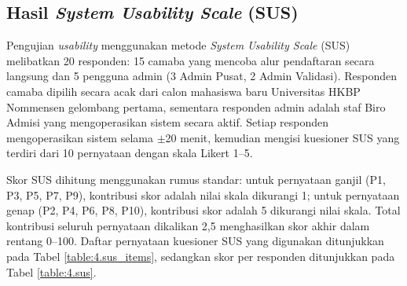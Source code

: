 \subsection{Hasil \textit{System Usability Scale} (SUS)} \label{IV.HasilSUS}

Pengujian \textit{usability} menggunakan metode \textit{System Usability Scale} (SUS) melibatkan 20 responden: 15 camaba yang mencoba alur pendaftaran secara langsung dan 5 pengguna admin (3 Admin Pusat, 2 Admin Validasi). Responden camaba dipilih secara acak dari calon mahasiswa baru Universitas HKBP Nommensen gelombang pertama, sementara responden admin adalah staf Biro Admisi yang mengoperasikan sistem secara aktif. Setiap responden mengoperasikan sistem selama $\pm$20 menit, kemudian mengisi kuesioner SUS yang terdiri dari 10 pernyataan dengan skala Likert 1--5.\par

Skor SUS dihitung menggunakan rumus standar: untuk pernyataan ganjil (P1, P3, P5, P7, P9), kontribusi skor adalah nilai skala dikurangi 1; untuk pernyataan genap (P2, P4, P6, P8, P10), kontribusi skor adalah 5 dikurangi nilai skala. Total kontribusi seluruh pernyataan dikalikan 2{,}5 menghasilkan skor akhir dalam rentang 0--100. Daftar pernyataan kuesioner SUS yang digunakan ditunjukkan pada Tabel \ref{table:4.sus_items}, sedangkan skor per responden ditunjukkan pada Tabel \ref{table:4.sus}.\par

